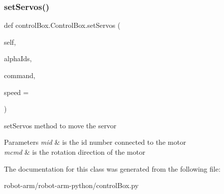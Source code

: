 \subsubsection{\texorpdfstring{set\+Servos()}{setServos()}}
{\footnotesize\ttfamily def control\+Box.\+Control\+Box.\+set\+Servos (\begin{DoxyParamCaption}\item[{}]{self,  }\item[{}]{alpha\+Ids,  }\item[{}]{command,  }\item[{}]{speed = {} }\end{DoxyParamCaption})}



set\+Servos method to move the servor ~\newline
 


\begin{DoxyParams}{Parameters}
{\em mid} & is the id number connected to the motor \\
\hline
{\em mcmd} & is the rotation direction of the motor \\
\hline
\end{DoxyParams}


The documentation for this class was generated from the following file\+:\begin{DoxyCompactItemize}
\item 
robot-\/arm/robot-\/arm-\/python/control\+Box.\+py\end{DoxyCompactItemize}
